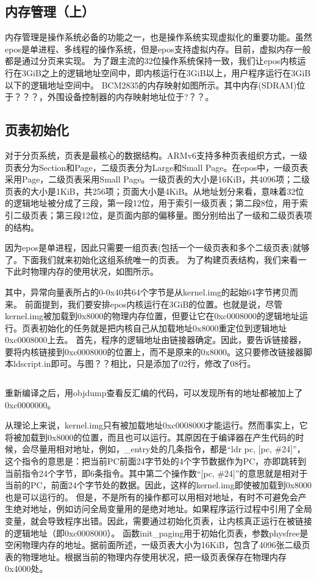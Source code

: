 \documentclass[main.tex]{subfiles}
\begin{document}
\begin{CJK*}{UTF8}{song}

\chapter{内存管理（上）}
内存管理是操作系统必备的功能之一，也是操作系统实现虚拟化的重要功能。虽然epos是单进程、多线程的操作系统，但是epos支持虚拟内存。目前，虚拟内存一般都是通过分页来实现。
为了跟主流的32位操作系统保持一致，我们让epos内核运行在3GiB之上的逻辑地址空间中，即内核运行在3GiB以上，用户程序运行在3GiB以下的逻辑地址空间中。
BCM2835的内存映射如图所示。其中内存(SDRAM)位于？？？，外围设备控制器的内存映射地址位于?？？。

\section{页表初始化}
对于分页系统，页表是最核心的数据结构。ARMv6支持多种页表组织方式，一级页表分为Section和Page，二级页表分为Large和Small Page。在epos中，一级页表采用Page，二级页表采用Small Page。一级页表的大小是16KiB，共4096项；二级页表的大小是1KiB，共256项；页面大小是4KiB。从地址划分来看，意味着32位的逻辑地址被分成了三段，第一段12位，用于索引一级页表；第二段8位，用于索引二级页表；第三段12位，是页面内部的偏移量。图分别给出了一级和二级页表项的结构。

因为epos是单进程，因此只需要一组页表(包括一个一级页表和多个二级页表)就够了。下面我们就来初始化这组系统唯一的页表。
为了构建页表结构，我们来看一下此时物理内存的使用状况，如图所示。


其中，异常向量表所占的0-0x40共64个字节是从kernel.img的起始64字节拷贝而来。
前面提到，我们要安排epos内核运行在3GiB的位置。也就是说，尽管kernel.img被加载到0x8000的物理内存位置，但要让它在0xc0008000的逻辑地址运行。页表初始化的任务就是把内核自己从加载地址0x8000重定位到逻辑地址0xc0008000上去。
首先，程序的逻辑地址由链接器确定。因此，要告诉链接器，要将内核链接到0xc0008000的位置上，而不是原来的0x8000。这只要修改链接器脚本ldscript.in即可。与图？？相比，只是添加了02行，修改了08行。
\inputminted[linenos,numbersep=5pt,frame=lines,framesep=2mm]{c}{chapter04/kernel/kernel.ld.in}

重新编译之后，用objdump查看反汇编的代码，可以发现所有的地址都被加上了0xc0000000。


从理论上来说，kernel.img只有被加载地址0xc0008000才能运行。然而事实上，它将被加载到0x8000的位置，而且也可以运行。其原因在于编译器在产生代码的时候，会尽量用相对地址，例如，\_entry处的几条指令，都是“ldr pc, [pc, \#24]”，这个指令的意思是：把当前PC前面24字节处的4个字节数据作为PC，亦即跳转到当前指令24个字节，即6条指令。其中第二个操作数“[pc, \#24]”的意思就是相对于当前的PC，前面24个字节处的数据。因此，这样的kernel.img即使被加载到0x8000也是可以运行的。
但是，不是所有的操作都可以用相对地址，有时不可避免会产生绝对地址，例如访问全局变量用的是绝对地址。如果程序运行过程中引用了全局变量，就会导致程序出错。因此，需要通过初始化页表，让内核真正运行在被链接的逻辑地址（即0xc0008000）。
函数init\_paging用于初始化页表，参数physfree是空闲物理内存的地址。据前面所述，一级页表大小为16KiB，包含了4096张二级页表的物理地址。根据当前的物理内存使用状况，把一级页表保存在物理内存0x4000处。
\inputminted[firstline=135,lastline=147,linenos,numbersep=5pt,frame=lines,framesep=2mm]{c}{chapter04/kernel/machdep.c}


\end{CJK*}
\end{document}
